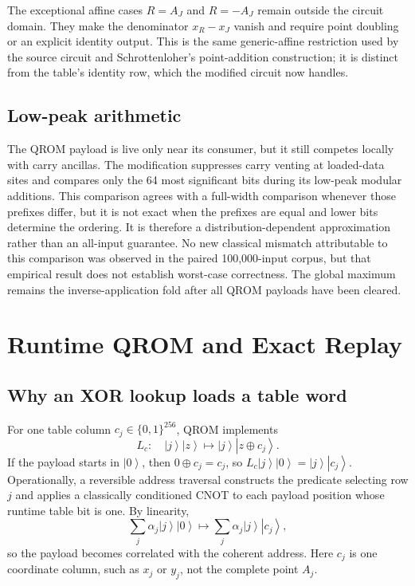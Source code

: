 \documentclass[10pt]{article}
\newcommand{\ket}[1]{\left\lvert #1\right\rangle}
\begin{document}
The exceptional affine cases $R=A_J$ and $R=-A_J$ remain outside the circuit domain. They make the denominator $x_R-x_J$ vanish and require point doubling or an explicit identity output. This is the same generic-affine restriction used by the source circuit and Schrottenloher's point-addition construction; it is distinct from the table's identity row, which the modified circuit now handles.

\subsection{Low-peak arithmetic}

The QROM payload is live only near its consumer, but it still competes locally with carry ancillas. The modification suppresses carry venting at loaded-data sites and compares only the 64 most significant bits during its low-peak modular additions. This comparison agrees with a full-width comparison whenever those prefixes differ, but it is not exact when the prefixes are equal and lower bits determine the ordering. It is therefore a distribution-dependent approximation rather than an all-input guarantee. No new classical mismatch attributable to this comparison was observed in the paired 100,000-input corpus, but that empirical result does not establish worst-case correctness. The global maximum remains the inverse-application fold after all QROM payloads have been cleared.

\section{Runtime QROM and Exact Replay}

\subsection{Why an XOR lookup loads a table word}

For one table column $c_j\in\{0,1\}^{256}$, QROM implements
\begin{equation}
L_c:\quad \ket{j}\ket{z}\longmapsto\ket{j}\ket{z\oplus c_j}.
\label{eq:xor-load}
\end{equation}
If the payload starts in $\ket{0}$, then $0\oplus c_j=c_j$, so $L_c\ket{j}\ket{0}=\ket{j}\ket{c_j}$. Operationally, a reversible address traversal constructs the predicate selecting row $j$ and applies a classically conditioned CNOT to each payload position whose runtime table bit is one. By linearity,
\begin{equation}
\sum_j\alpha_j\ket{j}\ket{0}\longmapsto\sum_j\alpha_j\ket{j}\ket{c_j},
\label{eq:coherent-load}
\end{equation}
so the payload becomes correlated with the coherent address. Here $c_j$ is one coordinate column, such as $x_j$ or $y_j$, not the complete point $A_j$.
\end{document}
